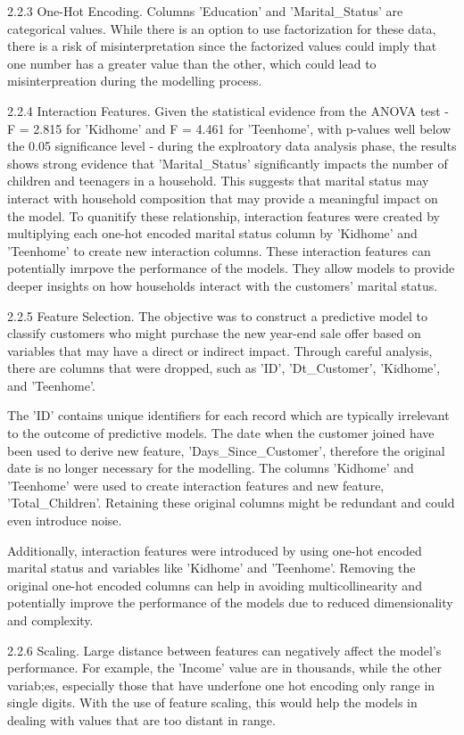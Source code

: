 2.2.3 One-Hot Encoding. Columns 'Education' and 'Marital_Status' are categorical values. While there is an option to use factorization for these data, there is a risk of misinterpretation since the factorized values could imply that one number has a greater value than the other, which could lead to misinterpreation during the modelling process. 

2.2.4 Interaction Features. Given the statistical evidence from the ANOVA test - F = 2.815 for 'Kidhome' and F = 4.461 for 'Teenhome', with p-values well below the 0.05 significance level - during the explroatory data analysis phase, the results shows strong evidence that 'Marital_Status' significantly impacts the number of children and teenagers in a household. This suggests that marital status may interact with household composition that may provide a meaningful impact on the model. To quanitify these relationship, interaction features were created by multiplying each one-hot encoded marital status column by 'Kidhome' and 'Teenhome' to create new interaction columns. These interaction features can potentially imrpove the performance of the models. They allow models to provide deeper insights on how households interact with the customers' marital status.

2.2.5 Feature Selection. The objective was to construct a predictive model to classify customers who might purchase the new year-end sale offer based on variables that may have a direct or indirect impact. Through careful analysis, there are columns that were dropped, such as 'ID', 'Dt_Customer', 'Kidhome', and 'Teenhome'. 

The 'ID' contains unique identifiers for each record which are typically irrelevant to the outcome of predictive models. The date when the customer joined have been used to derive new feature, 'Days_Since_Customer', therefore the original date is no longer necessary for the modelling. The columns 'Kidhome' and 'Teenhome' were used to create interaction features and new feature, 'Total_Children'. Retaining these original columns might be redundant and could even introduce noise.

Additionally, interaction features were introduced by  using one-hot encoded marital status and variables like 'Kidhome' and 'Teenhome'. Removing the original one-hot encoded columns can help in avoiding multicollinearity and potentially improve the performance of the models due to reduced dimensionality and complexity.

2.2.6 Scaling. Large distance between features can negatively affect the model's performance. For example, the 'Income' value are in thousands, while the other variab;es, especially those that have underfone one hot encoding only range in single digits. With the use of feature scaling, this would help the models in dealing with values that are too distant in range.

